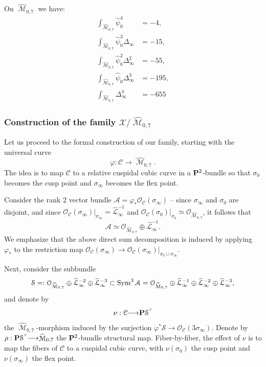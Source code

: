 \documentclass[12pt,reqno]{amsart}
\DeclareMathOperator{\M}{\mathcal{M}}
\renewcommand{\to}{{\longrightarrow}}
\numberwithin{equation}{section}
\renewcommand{\O}{\mathcal O}
\newcommand{\cC}{\mathcal{C}}
\newcommand{\cX}{\mathcal{X}}
\newcommand{\hL}{\widehat{\mathcal{L}}}
\newcommand{\smvee}{\raise0.5ex\hbox{$\scriptscriptstyle\vee$}}
\newcommand{\hM}{\widehat{\M}}
\begin{document}
\begin{lemma}
  \label{lemma:monomials} On $\hM_{0,7}$ we have:
  \begin{align}
    \int_{\hM_{0,7}}\widehat{\psi}_{0}^{4}& = -4, \\ \nonumber
    \int_{\hM_{0,7}}\widehat{\psi}_{0}^{3}\Delta_{\infty}& = -15, \\ \nonumber
    \int_{\hM_{0,7}}\widehat{\psi}_{0}^{2}\Delta_{\infty}^{2}& = -55, \\ \nonumber
    \int_{\hM_{0,7}}\widehat{\psi}_{0}\Delta_{\infty}^{3}& = -195, \\ \nonumber
    \int_{\hM_{0,7}}\Delta_{\infty}^{4}& = -655
  \end{align}
\end{lemma}

\subsubsection{Construction of the family $\cX/\hM_{0,7}$}
\label{sec:constr-family-hM07}

Let us proceed to the formal construction of our family, starting with
the universal curve
$$\varphi: \cC \to \hM_{0,7}.$$
The idea is to map $\cC$ to a relative cuspidal cubic curve in a
$\P^{2}$-bundle so that $\sigma_{0}$ becomes the cusp point and
$\sigma_{\infty}$ becomes the flex point.


Consider the rank $2$
vector bundle $\mathcal{A} = \varphi_{*}\O_{\cC}(\sigma_{\infty})$ --
since $\sigma_{\infty}$ and $\sigma_{0}$ are disjoint, and since
$\O_{\cC}(\sigma_{\infty})|_{\sigma_{\infty}} = \hL_{\infty}^{-1}$ and
$\O_{\cC}(\sigma_{0})|_{\sigma_{0}} \simeq \O_{\hM_{0,7}}$, it follows
that
$$\mathcal{A} \simeq \O_{\hM_{0,7}} \oplus \hL_{\infty}^{-1}.$$
We emphasize that the above direct sum decomposition is induced by
applying $\varphi_{*}$ to the restriction map
$\O_{\cC}(\sigma_{\infty}) \to \O_{\cC}(\sigma_{\infty})|_{\sigma_{0}
  \cup \sigma_{\infty}}.$

  Next, consider the subbundle
  \begin{align}
    \label{eq:S}
    \mathcal{S} = :\O_{\hM_{0,7}} \oplus \hL_{\infty}^{-2} \oplus \hL_{\infty}^{-3} \subset \Sym^{3} \mathcal{A} = \O_{\hM_{0,7}} \oplus \hL_{\infty}^{-1} \oplus \hL_{\infty}^{-2} \oplus \hL_{\infty}^{-3},
  \end{align}
  and denote by
  \begin{align}
    \label{eq:nu}
    \nu: \cC \to \P \mathcal{S}^{\smvee}
  \end{align}
  the $\hM_{0,7}$-morphism induced by the surjection
  $\varphi^{*}\mathcal{S} \to \O_{\cC}(3\sigma_{\infty})$. Denote by
  $\rho: \P \mathcal{S}^{\smvee} \to \hM_{0,7}$ the $\P^{2}$-bundle
  structural map.  Fiber-by-fiber, the effect of $\nu$ is to map the
  fibers of $\cC$ to a cuspidal cubic curve, with $\nu(\sigma_{0})$
  the cusp point and $\nu(\sigma_{\infty})$ the flex point.
\end{document}
